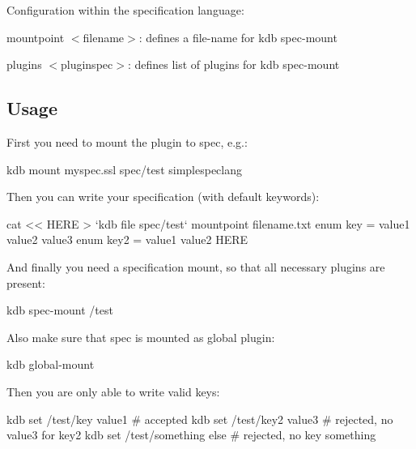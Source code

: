 Configuration within the specification language\+:


\begin{DoxyItemize}
\item {\ttfamily mountpoint $<$filename$>$}\+: defines a file-\/name for {\ttfamily kdb spec-\/mount}
\item {\ttfamily plugins $<$pluginspec$>$}\+: defines list of plugins for {\ttfamily kdb spec-\/mount}
\end{DoxyItemize}

\subsection*{Usage}

First you need to mount the plugin to spec, e.\+g.\+: \begin{DoxyVerb}kdb mount myspec.ssl spec/test simplespeclang
\end{DoxyVerb}


Then you can write your specification (with default keywords)\+: \begin{DoxyVerb}cat << HERE > `kdb file spec/test`
mountpoint filename.txt
enum key = value1 value2 value3
enum key2 = value1 value2
HERE
\end{DoxyVerb}


And finally you need a specification mount, so that all necessary plugins are present\+: \begin{DoxyVerb}kdb spec-mount /test
\end{DoxyVerb}


Also make sure that {\ttfamily spec} is mounted as global plugin\+: \begin{DoxyVerb}kdb global-mount
\end{DoxyVerb}


Then you are only able to write valid keys\+: \begin{DoxyVerb}kdb set /test/key value1  # accepted
kdb set /test/key2 value3 # rejected, no value3 for key2
kdb set /test/something else # rejected, no key something\end{DoxyVerb}
 